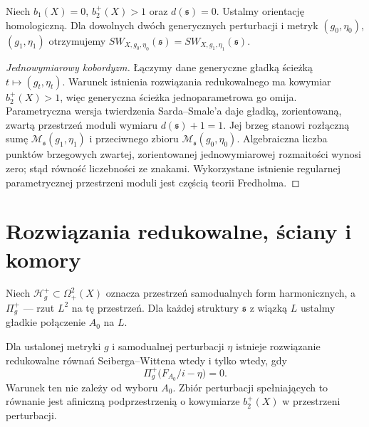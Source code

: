 \begin{stwierdzenie}
\label{prop:tg-sw-cobordism}
Niech $b_1(X)=0$, $b_2^+(X)>1$ oraz
$d(\mathfrak s)=0$. Ustalmy orientację homologiczną.
Dla dowolnych dwóch generycznych perturbacji i metryk
$(g_0,\eta_0)$, $(g_1,\eta_1)$ otrzymujemy
$SW_{X,g_0,\eta_0}(\mathfrak s)
=SW_{X,g_1,\eta_1}(\mathfrak s)$.
\end{stwierdzenie}

\begin{proof}[Jednowymiarowy kobordyzm]
Łączymy dane generyczne gładką ścieżką
$t\mapsto(g_t,\eta_t)$. Warunek istnienia rozwiązania
redukowalnego ma kowymiar $b_2^+(X)>1$,
więc generyczna ścieżka jednoparametrowa go omija.
Parametryczna wersja twierdzenia Sarda--Smale'a
daje gładką, zorientowaną, zwartą przestrzeń moduli
wymiaru $d(\mathfrak s)+1=1$.
Jej brzeg stanowi rozłączną sumę
$\mathcal M_{\mathfrak s}(g_1,\eta_1)$ i przeciwnego
zbioru $\mathcal M_{\mathfrak s}(g_0,\eta_0)$.
Algebraiczna liczba punktów brzegowych zwartej,
zorientowanej jednowymiarowej rozmaitości wynosi zero;
stąd równość liczebności ze znakami.
Wykorzystane istnienie regularnej parametrycznej
przestrzeni moduli jest częścią teorii Fredholma.
\end{proof}

\section{Rozwiązania redukowalne, ściany i komory}
\label{sec:tg-sw-chambers}

Niech $\mathcal H_g^+\subset\Omega^2_+(X)$ oznacza
przestrzeń samodualnych form harmonicznych, a
$\Pi_g^+$ --- rzut $L^2$ na tę przestrzeń.
Dla każdej struktury $\mathfrak s$ z wiązką $L$
ustalmy gładkie połączenie $A_0$ na $L$.

\begin{stwierdzenie}
\label{prop:tg-sw-wall}
Dla ustalonej metryki $g$ i samodualnej perturbacji
$\eta$ istnieje rozwiązanie redukowalne równań
Seiberga--Wittena wtedy i tylko wtedy, gdy
\[
\Pi_g^+\bigl(F_{A_0}/i-\eta\bigr)=0.
\]
Warunek ten nie zależy od wyboru $A_0$. Zbiór perturbacji
spełniających to równanie jest afiniczną podprzestrzenią
o kowymiarze $b_2^+(X)$ w przestrzeni perturbacji.
\end{stwierdzenie}

